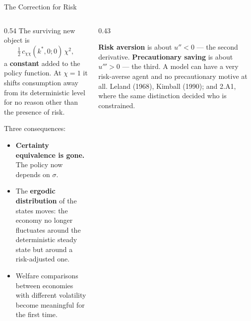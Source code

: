 \begin{frame}{The Correction for Risk}
\begin{columns}[T]
\begin{column}{0.54\textwidth}
\small
The surviving new object is
\[
  \tfrac12\,c_{\chi\chi}(k^{*},0;0)\,\chi^{2} ,
\]
a \textbf{constant} added to the policy function. At $\chi=1$ it shifts consumption away from its deterministic level for no reason other than the presence of risk.
\medskip

Three consequences:
\begin{itemize}\small
  \item \textbf{Certainty equivalence is gone.} The policy now depends on $\sigma$.
  \item The \textbf{ergodic distribution} of the states moves: the economy no longer fluctuates around the deterministic steady state but around a risk-adjusted one.
  \item Welfare comparisons between economies with different volatility become meaningful for the first time.
\end{itemize}
\end{column}
\begin{column}{0.43\textwidth}
\begin{cautionbox}[title=\textbf{A distinction worth keeping}]\small
\textbf{Risk aversion} is about $u''<0$ --- the second derivative. \textbf{Precautionary saving} is about $u'''>0$ --- the third.
\medskip
A model can have a very risk-averse agent and no precautionary motive at all. Leland (1968), Kimball (1990); and 2.A1, where the same distinction decided who is constrained.
\end{cautionbox}
\end{column}
\end{columns}
\vspace{1mm}
\end{frame}


